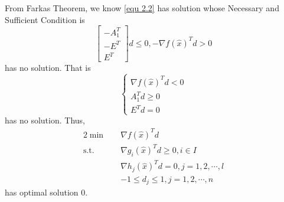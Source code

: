 \documentclass[paper=a4, fontsize=11pt]{scrartcl} %
\numberwithin{equation}{section} %
\numberwithin{figure}{section} %
\numberwithin{table}{section} %
\begin{document}
From Farkas Theorem, we know \ref{equ 2.2} has solution whose Necessary and Sufficient Condition is
\begin{equation}
\begin{bmatrix}-A_1^T\\ -E^T\\ E^T\end{bmatrix}d\leq0, -\nabla f(\hat{x})^Td> 0
\end{equation}
has no solution. That is
\begin{equation}
\left\{
\begin{aligned}
\nabla f(\hat{x})^Td< 0\\
A_1^Td\geq0\\
E^Td = 0
\end{aligned}
\right. \nonumber
\end{equation}
has no solution. Thus,
\begin{alignat}{2}          \nonumber
\min\quad & \nabla f(\hat{x})^Td \\    \nonumber
\mbox{s.t.}\quad            \nonumber
& \nabla g_i(\hat{x})^Td \geq0, i\in I \\    \nonumber
& \nabla h_j(\hat{x})^Td =0, j=1,2,\cdots,l\\ \nonumber
& -1 \leq d_j \leq 1, j =1,2,\cdots,n
\end{alignat}
has optimal solution 0.
\end{document}
